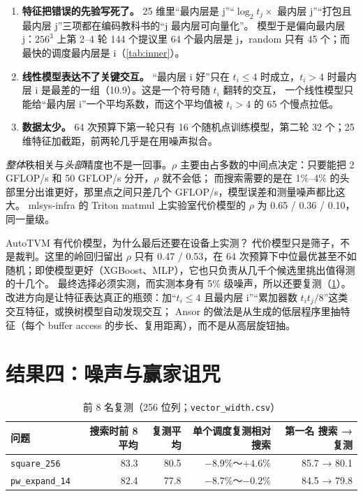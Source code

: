 \documentclass[11pt,a4paper]{ctexart}
\newcommand{\sk}[1]{\texttt{#1}}
\begin{document}
\begin{enumerate}
  \item \textbf{特征把错误的先验写死了。} 25 维里“最内层是 j”“$\log_2 t_j\times$ 最内层 j”“打包且最内层 j”三项都在编码教科书的“j 最内层可向量化”。
  模型于是偏向最内层 j：$256^3$ 上第 2--4 轮 144 个提议里 64 个最内层是 j，random 只有 45 个；而最快的调度最内层是 i（\cref{tab:inner}）。
  \item \textbf{线性模型表达不了关键交互。} “最内层 i 好”只在 $t_i\le4$ 时成立，$t_i>4$ 时最内层 i 是最差的一组（10.9）。这是一个符号随 $t_i$ 翻转的交互，
  一个线性模型只能给“最内层 i”一个平均系数，而这个平均值被 $t_i>4$ 的 65 个慢点拉低。
  \item \textbf{数据太少。} 64 次预算下第一轮只有 16 个随机点训练模型，第二轮 32 个；25 维特征加截距，前两轮几乎是在用噪声拟合。
\end{enumerate}

\emph{整体}秩相关与\emph{头部}精度也不是一回事。$\rho$ 主要由占多数的中间点决定：只要能把 2 GFLOP/s 和 50 GFLOP/s 分开，$\rho$ 就不会低；
而搜索需要的是在 1\%--4\% 的头部里分出谁更好，那里点之间只差几个 GFLOP/s，模型误差和测量噪声都比这大。
mlsys-infra 的 Triton matmul 上实验室代价模型的 $\rho$ 为 0.65 / 0.36 / 0.10，同一量级。

\begin{iqbox}{AutoTVM 有代价模型，为什么最后还要在设备上实测？}
代价模型只是筛子，不是裁判。这里的岭回归留出 $\rho$ 只有 0.47 / 0.53，在 64 次预算下中位最优甚至不如随机；即使模型更好（XGBoost、MLP），它也只负责从几千个候选里挑出值得测的十几个。
最终选择必须实测，而实测本身有 5\% 级噪声，所以还要复测（\cref{sec:noise}）。
改进方向是让特征表达真正的瓶颈：加“$t_i\le4$ 且最内层 i”“累加器数 $t_i t_j/8$”这类交互特征，或换树模型自动发现交互；
Ansor 的做法是从生成的低层程序里抽特征（每个 buffer access 的步长、复用距离），而不是从高层旋钮抽。
\end{iqbox}

\section{结果四：噪声与赢家诅咒}\label{sec:noise}

\begin{table}[H]
\centering\small
\caption{前 8 名复测（256 位列；\texttt{vector\_width.csv}）}\label{tab:remeasure}
\begin{tabular}{lrrrr}
\toprule
问题 & 搜索时前 8 平均 & 复测平均 & 单个调度复测相对搜索 & 第一名 搜索 → 复测 \\
\midrule
\sk{square\_256} & 83.3 & 80.5 & $-8.9\%$～$+4.6\%$ & 85.7 → 80.1 \\
\sk{pw\_expand\_14} & 82.4 & 77.8 & $-8.7\%$～$-0.2\%$ & 84.5 → 79.8 \\
\bottomrule
\end{tabular}
\end{table}
\end{document}

